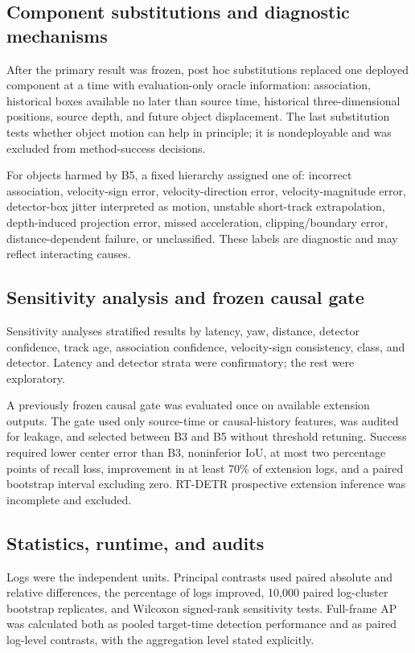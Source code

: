 \documentclass[journal]{IEEEtran}
\begin{document}
\subsection{Component substitutions and diagnostic mechanisms}
After the primary result was frozen, post hoc substitutions replaced one deployed component at a time with evaluation-only oracle information: association, historical boxes available no later than source time, historical three-dimensional positions, source depth, and future object displacement. The last substitution tests whether object motion can help in principle; it is nondeployable and was excluded from method-success decisions.

For objects harmed by B5, a fixed hierarchy assigned one of: incorrect association, velocity-sign error, velocity-direction error, velocity-magnitude error, detector-box jitter interpreted as motion, unstable short-track extrapolation, depth-induced projection error, missed acceleration, clipping/boundary error, distance-dependent failure, or unclassified. These labels are diagnostic and may reflect interacting causes.

\subsection{Sensitivity analysis and frozen causal gate}
Sensitivity analyses stratified results by latency, yaw, distance, detector confidence, track age, association confidence, velocity-sign consistency, class, and detector. Latency and detector strata were confirmatory; the rest were exploratory.

A previously frozen causal gate was evaluated once on available extension outputs. The gate used only source-time or causal-history features, was audited for leakage, and selected between B3 and B5 without threshold retuning. Success required lower center error than B3, noninferior IoU, at most two percentage points of recall loss, improvement in at least 70\% of extension logs, and a paired bootstrap interval excluding zero. RT-DETR prospective extension inference was incomplete and excluded.

\subsection{Statistics, runtime, and audits}
Logs were the independent units. Principal contrasts used paired absolute and relative differences, the percentage of logs improved, 10,000 paired log-cluster bootstrap replicates, and Wilcoxon signed-rank sensitivity tests. Full-frame AP was calculated both as pooled target-time detection performance and as paired log-level contrasts, with the aggregation level stated explicitly.
\end{document}
